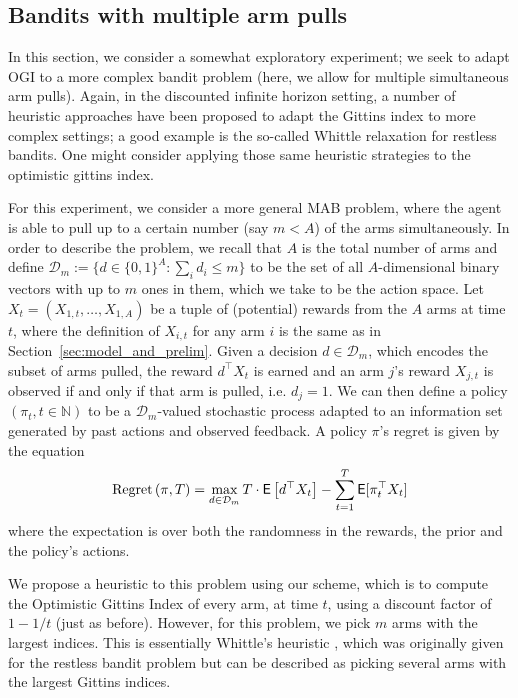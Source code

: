 \subsection{Bandits with multiple arm pulls}

In this section, we consider a somewhat exploratory experiment; we seek to adapt OGI to a more complex bandit problem (here, we allow for multiple simultaneous arm pulls). Again, in the discounted infinite horizon setting, a number of heuristic approaches have been proposed to adapt the Gittins index to more complex settings; a good example is the so-called Whittle relaxation for restless bandits. One might consider applying those same heuristic strategies to the optimistic gittins index. 

For this experiment, we consider a more general MAB problem, where the agent is able to pull up to a certain number (say $m < A$) of the arms simultaneously. In order to describe the problem, we recall that $A$ is the total number of arms and define  $\mathcal{D}_m := \{d \in \{0,1\}^A : \sum_i d_i \le m\}$ to be the set of all $A$-dimensional binary vectors with up to $m$ ones in them, which we take to be the action space. Let $X_t = (X_{1,t}, \ldots, X_{1,A})$ be a tuple of (potential) rewards from the $A$ arms at time $t$, where the definition of $X_{i,t}$ for any arm $i$ is the same as in Section~\ref{sec:model_and_prelim}. Given a decision $d \in \mathcal D_m$, which encodes the subset of arms pulled, the reward $d^\top X_t$ is earned and an arm $j$'s reward $X_{j,t}$ is observed if and only if that arm is pulled, i.e. $d_{j} = 1$. We can then define a policy $(\pi_t, t \in \mathbb{N})$ to be a $\mathcal{D}_m$-valued stochastic process adapted to an information set generated by past actions and observed feedback. 
 A policy $\pi$'s regret is given by the equation 
\[
\textnormal{Regret} \left( \pi, T \right) = \max_{d \in \mathcal D_m} T \cdot \mathsf{E} \left[  d^\top  X_t \right] - \sum_{t=1}^T \mathsf{E}[\pi_t^\top X_t ]
\]
where the expectation is over both the randomness in the rewards, the prior and the policy's actions.

We propose a heuristic to this problem using our scheme, which is to compute the Optimistic Gittins Index of every arm, at time $t$, using a discount factor of $1-1/t$ (just as before). However, for this problem, we pick $m$ arms with the largest indices. This is essentially Whittle's heuristic \citep{whittle1988restless}, which was originally given for the restless bandit problem but can be described as picking several arms with the largest Gittins indices.

